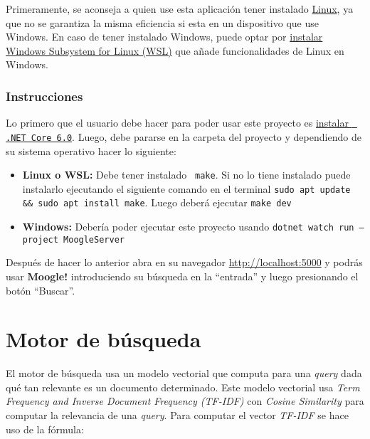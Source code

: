 \documentclass[a4paper, 12pt]{article}
\begin{document}
Primeramente, se aconseja a quien use esta aplicación tener instalado
\href{https://es.wikipedia.org/wiki/Linux}{Linux}, ya que no se garantiza la
misma eficiencia si esta en un dispositivo que use Windows. En caso de tener
instalado Windows, puede optar por
\href{https://learn.microsoft.com/es-es/windows/wsl/install}{instalar Windows
	Subsystem for Linux (WSL)} que a\~nade funcionalidades de Linux en Windows.

\subsubsection*{Instrucciones}

Lo primero que el usuario debe hacer para poder usar este proyecto es
\href{https://learn.microsoft.com/es-es/dotnet/core/install/}{instalar {\tt
			\color{gray45}.NET Core 6.0}}. Luego, debe pararse en la carpeta del proyecto y
dependiendo de su sistema operativo hacer lo siguiente:

\begin{itemize}
	\item {\bf Linux o WSL:} Debe tener instalado {\tt \color{gray45} make}. Si no lo tiene instalado
	      puede instalarlo ejecutando el siguiente comando en el terminal {\tt \color{gray45}sudo apt update \&\& sudo apt install make}. Luego deberá ejecutar {\tt \color{gray45}make dev}

	\item {\bf Windows:} Debería poder ejecutar este proyecto usando {\tt \color{gray45}dotnet watch run --project MoogleServer}
\end{itemize}

Después de hacer lo anterior abra en su navegador
\href{http://localhost:5000}{http://localhost:5000} y podrás usar {\bf
		Moogle!} introduciendo su búsqueda en la ``entrada'' y luego presionando el
botón ``Buscar''.

\section*{Motor de búsqueda}

El motor de búsqueda usa un modelo vectorial que computa para una {\it query}
dada qué tan relevante es un documento determinado. Este modelo vectorial usa
	{\it Term Frequency and Inverse Document Frequency (TF-IDF)} con {\it Cosine
		Similarity} para computar la relevancia de una {\it query}. Para computar el vector {\it TF-IDF}
se hace uso de la fórmula:
\end{document}
